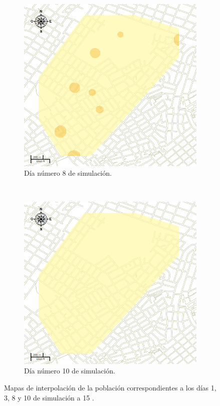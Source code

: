 \begin{figure}[!htbp]
    \begin{subfigure}[b]{0.45\textwidth}
            \includegraphics[width=\textwidth]{capitulo-6/graphics/raster/temp-15-7.png}
            \caption{\label{fig:niveles-infestacion-15-c}Día número 8 de simulación.}
    \end{subfigure}
    ~~
    \begin{subfigure}[b]{0.45\textwidth}
            \includegraphics[width=\textwidth]{capitulo-6/graphics/raster/temp-15-9.png}
            \caption{\label{fig:niveles-infestacion-15-d}Día número 10 de simulación.}
    \end{subfigure}

    \caption{\label{fig:niveles-infestacion-15} Mapas de interpolación de la población correspondientes a los días 1, 3, 8 y 10 de simulación a 15 \textcelsius.}
\end{figure}


